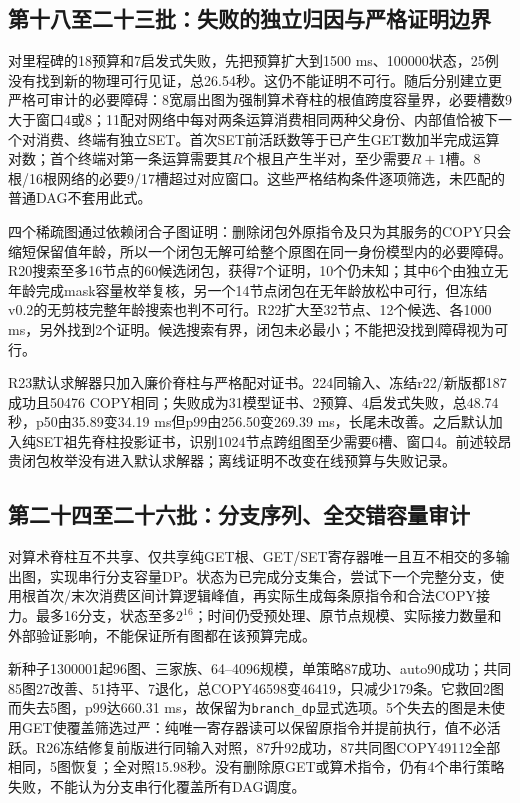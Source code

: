 \documentclass[UTF8,11pt,fontset=fandol]{ctexart}
\begin{document}
\subsection{第十八至二十三批：失败的独立归因与严格证明边界}
对里程碑的18预算和7启发式失败，先把预算扩大到1500 ms、100000状态，25例没有找到新的物理可行见证，总26.54秒。这仍不能证明不可行。随后分别建立更严格可审计的必要障碍：8宽扇出图为强制算术脊柱的根值跨度容量界，必要槽数9大于窗口4或8；11配对网络中每对两条运算消费相同两种父身份、内部值恰被下一个对消费、终端有独立SET。首次SET前活跃数等于已产生GET数加半完成运算对数；首个终端对第一条运算需要其$R$个根且产生半对，至少需要$R+1$槽。8根/16根网络的必要9/17槽超过对应窗口。这些严格结构条件逐项筛选，未匹配的普通DAG不套用此式。

四个稀疏图通过依赖闭合子图证明：删除闭包外原指令及只为其服务的COPY只会缩短保留值年龄，所以一个闭包无解可给整个原图在同一身份模型内的必要障碍。R20搜索至多16节点的60候选闭包，获得7个证明，10个仍未知；其中6个由独立无年龄完成mask容量枚举复核，另一个14节点闭包在无年龄放松中可行，但冻结v0.2的无剪枝完整年龄搜索也判不可行。R22扩大至32节点、12个候选、各1000 ms，另外找到2个证明。候选搜索有界，闭包未必最小；不能把没找到障碍视为可行。

R23默认求解器只加入廉价脊柱与严格配对证书。224同输入、冻结r22/新版都187成功且50476 COPY相同；失败成为31模型证书、2预算、4启发式失败，总48.74秒，p50由35.89变34.19 ms但p99由256.50变269.39 ms，长尾未改善。之后默认加入纯SET祖先脊柱投影证书，识别1024节点跨组图至少需要6槽、窗口4。前述较昂贵闭包枚举没有进入默认求解器；离线证明不改变在线预算与失败记录。

\subsection{第二十四至二十六批：分支序列、全交错容量审计}
对算术脊柱互不共享、仅共享纯GET根、GET/SET寄存器唯一且互不相交的多输出图，实现串行分支容量DP。状态为已完成分支集合，尝试下一个完整分支，使用根首次/末次消费区间计算逻辑峰值，再实际生成每条原指令和合法COPY接力。最多16分支，状态至多$2^{16}$；时间仍受预处理、原节点规模、实际接力数量和外部验证影响，不能保证所有图都在该预算完成。

新种子1300001起96图、三家族、64--4096规模，单策略87成功、auto90成功；共同85图27改善、51持平、7退化，总COPY46598变46419，只减少179条。它救回2图而失去5图，p99达660.31 ms，故保留为\texttt{branch\_dp}显式选项。5个失去的图是未使用GET使覆盖筛选过严：纯唯一寄存器读可以保留原指令并提前执行，值不必活跃。R26冻结修复前版进行同输入对照，87升92成功，87共同图COPY49112全部相同，5图恢复；全对照15.98秒。没有删除原GET或算术指令，仍有4个串行策略失败，不能认为分支串行化覆盖所有DAG调度。
\end{document}
